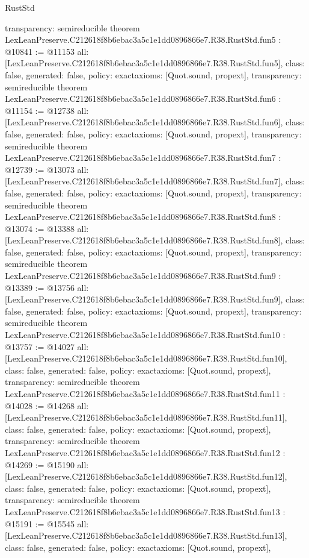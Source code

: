 \begin{lexlean}{RustStd}
\begin{coremodule}
{  transparency: semireducible
}
theorem LexLeanPreserve.C212618f8b6ebac3a5c1e1dd0896866e7.R38.RustStd.fun5 : @10841 := @11153 {
  all: [LexLeanPreserve.C212618f8b6ebac3a5c1e1dd0896866e7.R38.RustStd.fun5],
  class: false,
  generated: false,
  policy: exact{axioms: [Quot.sound, propext]},
  transparency: semireducible
}
theorem LexLeanPreserve.C212618f8b6ebac3a5c1e1dd0896866e7.R38.RustStd.fun6 : @11154 := @12738 {
  all: [LexLeanPreserve.C212618f8b6ebac3a5c1e1dd0896866e7.R38.RustStd.fun6],
  class: false,
  generated: false,
  policy: exact{axioms: [Quot.sound, propext]},
  transparency: semireducible
}
theorem LexLeanPreserve.C212618f8b6ebac3a5c1e1dd0896866e7.R38.RustStd.fun7 : @12739 := @13073 {
  all: [LexLeanPreserve.C212618f8b6ebac3a5c1e1dd0896866e7.R38.RustStd.fun7],
  class: false,
  generated: false,
  policy: exact{axioms: [Quot.sound, propext]},
  transparency: semireducible
}
theorem LexLeanPreserve.C212618f8b6ebac3a5c1e1dd0896866e7.R38.RustStd.fun8 : @13074 := @13388 {
  all: [LexLeanPreserve.C212618f8b6ebac3a5c1e1dd0896866e7.R38.RustStd.fun8],
  class: false,
  generated: false,
  policy: exact{axioms: [Quot.sound, propext]},
  transparency: semireducible
}
theorem LexLeanPreserve.C212618f8b6ebac3a5c1e1dd0896866e7.R38.RustStd.fun9 : @13389 := @13756 {
  all: [LexLeanPreserve.C212618f8b6ebac3a5c1e1dd0896866e7.R38.RustStd.fun9],
  class: false,
  generated: false,
  policy: exact{axioms: [Quot.sound, propext]},
  transparency: semireducible
}
theorem LexLeanPreserve.C212618f8b6ebac3a5c1e1dd0896866e7.R38.RustStd.fun10 : @13757 := @14027 {
  all: [LexLeanPreserve.C212618f8b6ebac3a5c1e1dd0896866e7.R38.RustStd.fun10],
  class: false,
  generated: false,
  policy: exact{axioms: [Quot.sound, propext]},
  transparency: semireducible
}
theorem LexLeanPreserve.C212618f8b6ebac3a5c1e1dd0896866e7.R38.RustStd.fun11 : @14028 := @14268 {
  all: [LexLeanPreserve.C212618f8b6ebac3a5c1e1dd0896866e7.R38.RustStd.fun11],
  class: false,
  generated: false,
  policy: exact{axioms: [Quot.sound, propext]},
  transparency: semireducible
}
theorem LexLeanPreserve.C212618f8b6ebac3a5c1e1dd0896866e7.R38.RustStd.fun12 : @14269 := @15190 {
  all: [LexLeanPreserve.C212618f8b6ebac3a5c1e1dd0896866e7.R38.RustStd.fun12],
  class: false,
  generated: false,
  policy: exact{axioms: [Quot.sound, propext]},
  transparency: semireducible
}
theorem LexLeanPreserve.C212618f8b6ebac3a5c1e1dd0896866e7.R38.RustStd.fun13 : @15191 := @15545 {
  all: [LexLeanPreserve.C212618f8b6ebac3a5c1e1dd0896866e7.R38.RustStd.fun13],
  class: false,
  generated: false,
  policy: exact{axioms: [Quot.sound, propext]},
}
\end{coremodule}
\end{lexlean}
